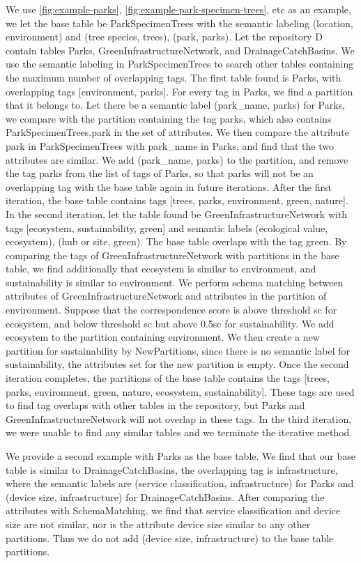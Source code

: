 We use \autoref{fig:example-parks}, \autoref{fig:example-park-specimen-trees}, etc as an example, we let the base table be ParkSpecimenTrees with the semantic labeling (location, environment) and (tree species, trees), (park, parks). Let the repository D contain tables Parks, GreenInfrastructureNetwork, and DrainageCatchBasins. We use the semantic labeling in ParkSpecimenTrees to search other tables containing the maximum number of overlapping tags. The first table found is Parks, with overlapping tags [environment, parks]. For every tag in Parks, we find a partition that it belongs to. Let there be a semantic label (park\_name, parks) for Parks, we compare with the partition containing the tag parks, which also contains ParkSpecimenTrees.park in the set of attributes. We then compare the attribute park in ParkSpecimenTrees with park\_name in Parks, and find that the two attributes are similar. We add (park\_name, parks) to the partition, and remove the tag parks from the list of tags of Parks, so that parks will not be an overlapping tag with the base table again in future iterations. After the first iteration, the base table contains tags [trees, parks, environment, green, nature]. In the second iteration, let the table found be GreenInfrastructureNetwork with tags [ecosystem, sustainability, green] and semantic labels {(ecological value, ecosystem), (hub or site, green)}. The base table overlaps with the tag green. By comparing the tags of GreenInfrastructureNetwork with partitions in the base table, we find additionally that ecosystem is similar to environment, and sustainability is similar to environment. We perform schema matching between attributes of GreenInfrastructureNetwork and attributes in the partition of environment. Suppose that the correspondence score is above threshold sc for ecosystem, and below threshold sc but above 0.5sc for sustainability. We add ecosystem to the partition containing environment. We then create a new partition for sustainability by NewPartitions, since there is no semantic label for sustainability, the attributes set for the new partition is empty. Once the second iteration completes, the partitions of the base table contains the tags [trees, parks, environment, green, nature, ecosystem, sustainability]. These tags are used to find tag overlaps with other tables in the repository, but Parks and GreenInfrastructureNetwork will not overlap in these tags. In the third iteration, we were unable to find any similar tables and we terminate the iterative method.

We provide a second example with Parks as the base table. We find that our base table is similar to DrainageCatchBasins, the overlapping tag is infrastructure, where the semantic labels are (service classification, infrastructure) for Parks and (device size, infrastructure) for DrainageCatchBasins. After comparing the attributes with SchemaMatching, we find that service classification and device size are not similar, nor is the attribute device size similar to any other partitions. Thus we do not add (device size, infrastructure) to the base table partitions.

